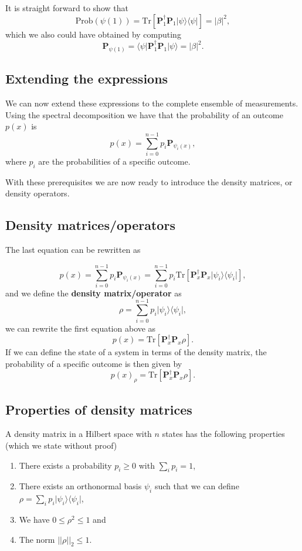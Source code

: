 It is straight forward to show that
\[
\mathrm{Prob}(\psi(1))=\mathrm{Tr}\left[\bm{P}_1^{\dagger}\bm{P}_1\vert \psi\rangle\langle \psi\vert\right]=\vert \beta\vert^2,
\]
which we also could have obtained by computing
\[
\bm{P}_{\psi(1)}=\langle \psi\vert \bm{P}_1^{\dagger}\bm{P}_1\vert \psi\rangle=\vert \beta\vert^2.
\]

\subsection{Extending the expressions}

We can now extend these expressions to the complete ensemble of measurements. Using the spectral decomposition we have that the probability of an outcome $p(x)$ is
\[
p(x)=\sum_{i=0}^{n-1}p_i\bm{P}_{\psi_i(x)},
\]
where $p_i$ are the probabilities of a specific outcome. 

With these prerequisites we are now ready to introduce the density  matrices, or density operators.

\subsection{Density matrices/operators}

The last equation can be rewritten as 

\[
p(x)=\sum_{i=0}^{n-1}p_i\bm{P}_{\psi_i(x)}=\sum_{i=0}^{n-1}p_i\mathrm{Tr}\left[\bm{P}_x^{\dagger}\bm{P}_x\vert \psi_i\rangle\langle \psi_i\vert\right],
\]
and we define the \textbf{density matrix/operator} as
\[
\rho=\sum_{i=0}^{n-1}p_i\vert \psi_i\rangle\langle \psi_i\vert,
\]
we can rewrite the first equation above as 
\[
p(x)=\mathrm{Tr}\left[\bm{P}_x^{\dagger}\bm{P}_x\rho\right].
\]
If we can define the state of a system in terms of the density matrix, the probability of a specific outcome is then given by
\[
p(x)_{\rho}=\mathrm{Tr}\left[\bm{P}_x^{\dagger}\bm{P}_x\rho\right].
\]

\subsection{Properties of density matrices}

A density matrix in a Hilbert space with $n$ states has the following properties (which we state without proof)
\begin{enumerate}
\item There exists a probability $p_i\geq 0$ with $\sum_ip_i=1$,

\item There exists an orthonormal basis $\psi_i$ such that we can define $\rho=\sum_ip_i\vert\psi_i\rangle\langle \psi_i\vert$,

\item We have $0 \leq \rho^2\leq 1$ and

\item The norm $\vert\vert \rho \vert\vert_2\leq 1$.
\end{enumerate}

